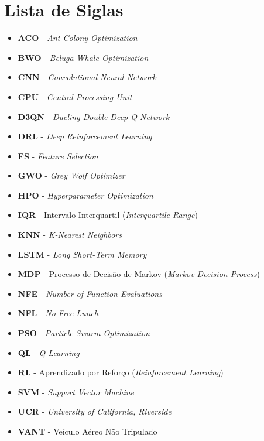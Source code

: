 \documentclass[12pt, a4paper, oneside]{report}
\begin{document}
\chapter*{Lista de Siglas}
\begin{itemize}[label={}, leftmargin=0pt]
    \item \textbf{ACO} - \textit{Ant Colony Optimization}
    \item \textbf{BWO} - \textit{Beluga Whale Optimization}
    \item \textbf{CNN} - \textit{Convolutional Neural Network}
    \item \textbf{CPU} - \textit{Central Processing Unit}
    \item \textbf{D3QN} - \textit{Dueling Double Deep Q-Network}
    \item \textbf{DRL} - \textit{Deep Reinforcement Learning}
    \item \textbf{FS} - \textit{Feature Selection}
    \item \textbf{GWO} - \textit{Grey Wolf Optimizer}
    \item \textbf{HPO} - \textit{Hyperparameter Optimization}
    \item \textbf{IQR} - Intervalo Interquartil (\textit{Interquartile Range})
    \item \textbf{KNN} - \textit{K-Nearest Neighbors}
    \item \textbf{LSTM} - \textit{Long Short-Term Memory}
    \item \textbf{MDP} - Processo de Decisão de Markov (\textit{Markov Decision Process})
    \item \textbf{NFE} - \textit{Number of Function Evaluations}
    \item \textbf{NFL} - \textit{No Free Lunch}
    \item \textbf{PSO} - \textit{Particle Swarm Optimization}
    \item \textbf{QL} - \textit{Q-Learning}
    \item \textbf{RL} - Aprendizado por Reforço (\textit{Reinforcement Learning})
    \item \textbf{SVM} - \textit{Support Vector Machine}
    \item \textbf{UCR} - \textit{University of California, Riverside}
    \item \textbf{VANT} - Veículo Aéreo Não Tripulado
\end{itemize}
\clearpage

\listoffigures
\clearpage

\listoftables
\clearpage
\end{document}

